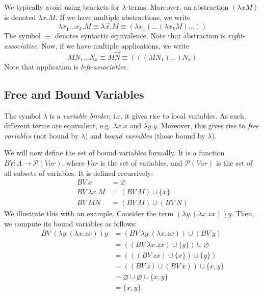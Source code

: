 \documentclass[a4paper, openany]{memoir}
\theoremstyle{definition}
\begin{document}
    We typically avoid using brackets for $\lambda$-terms. Moreover, an abstraction $(\lambda x M)$ is denoted $\lambda x.M$. If we have multiple abstractions, we write
    \[\lambda x_1 \dots x_k . M \equiv \lambda \vec{x}. M \equiv (\lambda x_1 (\dots (\lambda x_k M) \dots ))\]
    The symbol $\equiv$ denotes syntactic equivalence. Note that abstraction is \emph{right-associative}. Now, if we have multiple applications, we write
    \[M N_1 \dots N_k \equiv M \vec{N} \equiv (((M N_1) \dots ) N_k)\]
    Note that application is \emph{left-associative}.

    \subsection{Free and Bound Variables}
    The symbol $\lambda$ is a \emph{variable binder}, i.e. it gives rise to local variables. As such, different terms are equivalent, e.g. $\lambda x. x$ and $\lambda y. y$. Moreover, this gives rise to \emph{free variables} (not bound by $\lambda$) and \emph{bound variables} (those bound by $\lambda$).

    We will now define the set of bound variables formally. It is a function $BV \colon \Lambda \to \mathcal{P}(\textit{Var})$, where $\textit{Var}$ is the set of variables, and $\mathcal{P}(\textit{Var})$ is the set of all subsets of variables. It is defined recursively:
    \begin{align*}
        BV \ x &= \varnothing \\
        BV \ \lambda x. M &= (BV \ M) \cup \{x\} \\
        BV \ MN &= (BV \ M) \cup (BV \ N)
    \end{align*}
    We illustrate this with an example. Consider the term $(\lambda y. (\lambda x. zx)) y$. Then, we compute its bound variables as follows:
    \begin{align*}
        BV \ (\lambda y. (\lambda x. zx)) y &= (BV \ \lambda y. (\lambda x. zx)) \cup (BV \ y) \\
        &= ((BV \ \lambda x.zx) \cup \{y\}) \cup \varnothing \\
        &= (((BV \ zx) \cup \{x\}) \cup \{y\}) \\
        &= ((BV \ z) \cup (BV \ x)) \cup \{x, y\} \\
        &= \varnothing \cup \varnothing \cup \{x, y\} \\
        &= \{x, y\}.
    \end{align*}
\end{document}
